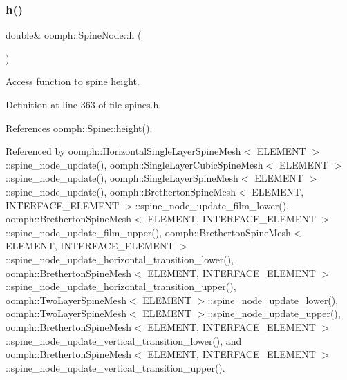 \mbox{\label{classoomph_1_1SpineNode_a531445631907d2b2164c26f25763fb57}} 
\subsubsection{\texorpdfstring{h()}{h()}}
{\footnotesize\ttfamily double\& oomph\+::\+Spine\+Node\+::h (\begin{DoxyParamCaption}{ }\end{DoxyParamCaption})\hspace{0.3cm}{\ttfamily [inline]}}



Access function to spine height. 



Definition at line 363 of file spines.\+h.



References oomph\+::\+Spine\+::height().



Referenced by oomph\+::\+Horizontal\+Single\+Layer\+Spine\+Mesh$<$ E\+L\+E\+M\+E\+N\+T $>$\+::spine\+\_\+node\+\_\+update(), oomph\+::\+Single\+Layer\+Cubic\+Spine\+Mesh$<$ E\+L\+E\+M\+E\+N\+T $>$\+::spine\+\_\+node\+\_\+update(), oomph\+::\+Single\+Layer\+Spine\+Mesh$<$ E\+L\+E\+M\+E\+N\+T $>$\+::spine\+\_\+node\+\_\+update(), oomph\+::\+Bretherton\+Spine\+Mesh$<$ E\+L\+E\+M\+E\+N\+T, I\+N\+T\+E\+R\+F\+A\+C\+E\+\_\+\+E\+L\+E\+M\+E\+N\+T $>$\+::spine\+\_\+node\+\_\+update\+\_\+film\+\_\+lower(), oomph\+::\+Bretherton\+Spine\+Mesh$<$ E\+L\+E\+M\+E\+N\+T, I\+N\+T\+E\+R\+F\+A\+C\+E\+\_\+\+E\+L\+E\+M\+E\+N\+T $>$\+::spine\+\_\+node\+\_\+update\+\_\+film\+\_\+upper(), oomph\+::\+Bretherton\+Spine\+Mesh$<$ E\+L\+E\+M\+E\+N\+T, I\+N\+T\+E\+R\+F\+A\+C\+E\+\_\+\+E\+L\+E\+M\+E\+N\+T $>$\+::spine\+\_\+node\+\_\+update\+\_\+horizontal\+\_\+transition\+\_\+lower(), oomph\+::\+Bretherton\+Spine\+Mesh$<$ E\+L\+E\+M\+E\+N\+T, I\+N\+T\+E\+R\+F\+A\+C\+E\+\_\+\+E\+L\+E\+M\+E\+N\+T $>$\+::spine\+\_\+node\+\_\+update\+\_\+horizontal\+\_\+transition\+\_\+upper(), oomph\+::\+Two\+Layer\+Spine\+Mesh$<$ E\+L\+E\+M\+E\+N\+T $>$\+::spine\+\_\+node\+\_\+update\+\_\+lower(), oomph\+::\+Two\+Layer\+Spine\+Mesh$<$ E\+L\+E\+M\+E\+N\+T $>$\+::spine\+\_\+node\+\_\+update\+\_\+upper(), oomph\+::\+Bretherton\+Spine\+Mesh$<$ E\+L\+E\+M\+E\+N\+T, I\+N\+T\+E\+R\+F\+A\+C\+E\+\_\+\+E\+L\+E\+M\+E\+N\+T $>$\+::spine\+\_\+node\+\_\+update\+\_\+vertical\+\_\+transition\+\_\+lower(), and oomph\+::\+Bretherton\+Spine\+Mesh$<$ E\+L\+E\+M\+E\+N\+T, I\+N\+T\+E\+R\+F\+A\+C\+E\+\_\+\+E\+L\+E\+M\+E\+N\+T $>$\+::spine\+\_\+node\+\_\+update\+\_\+vertical\+\_\+transition\+\_\+upper().

